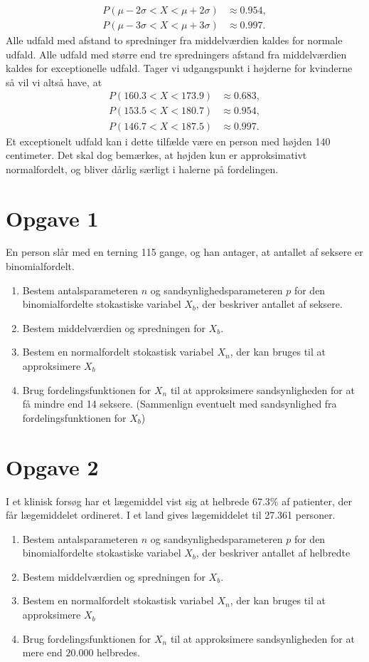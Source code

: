 \begin{exa}
\begin{align*}
  		P(\mu - 2\sigma < X < \mu + 2\sigma) &\approx 0.954,\\
  		P(\mu - 3\sigma < X < \mu + 3\sigma) &\approx 0.997.
  	\end{align*}
  	Alle udfald med afstand to spredninger fra middelværdien kaldes for normale udfald. 
  	Alle udfald med større end tre spredningers afstand fra middelværdien kaldes for exceptionelle udfald. 
  	Tager vi udgangspunkt i højderne for kvinderne så vil vi altså have, at 
  	\begin{align*}
  		P(160.3< X < 173.9) &\approx 0.683,\\
  		P(153.5< X < 180.7) &\approx 0.954,\\
  		P(146.7 < X < 187.5) &\approx 0.997.
  	\end{align*}
  	Et exceptionelt udfald kan i dette tilfælde være en person med højden 140 centimeter. Det skal dog bemærkes, at højden kun er approksimativt normalfordelt, og bliver dårlig særligt i halerne på 
  	fordelingen. 
\end{exa}


\section*{Opgave 1}

En person slår med en terning 115 gange, og han antager, at antallet af seksere er binomialfordelt. 
\begin{enumerate}[label=\roman*)]
	\item Bestem antalsparameteren $n$ og sandsynlighedsparameteren $p$ for den binomialfordelte stokastiske variabel $X_b$, der beskriver antallet af seksere.
	\item Bestem middelværdien og spredningen for $X_b$.
	\item Bestem en normalfordelt stokastisk variabel $X_n$, der kan bruges til at approksimere $X_b$
	\item Brug fordelingsfunktionen for $X_n$ til at approksimere sandsynligheden for at få mindre end 14 seksere. (Sammenlign eventuelt med sandsynlighed fra fordelingsfunktionen for $X_b$)
\end{enumerate}

\section*{Opgave 2}
I et klinisk forsøg har et lægemiddel vist sig at helbrede $67.3\%$ af patienter, der får lægemiddelet ordineret. I et land gives lægemiddelet til 27.361 personer.
\begin{enumerate}[label=\roman*)]
	\item Bestem antalsparameteren $n$ og sandsynlighedsparameteren $p$ for den binomialfordelte stokastiske variabel $X_b$, der beskriver antallet af helbredte
	\item Bestem middelværdien og spredningen for $X_b$.
	\item Bestem en normalfordelt stokastisk variabel $X_n$, der kan bruges til at approksimere $X_b$
	\item Brug fordelingsfunktionen for $X_n$ til at approksimere sandsynligheden for at mere end $20.000$ helbredes. 
\end{enumerate}
